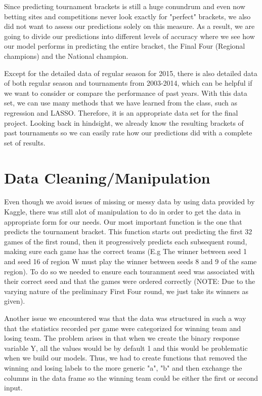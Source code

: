 \documentclass{article} %
\begin{document}
Since predicting tournament brackets is still a huge conundrum and even now betting sites and competitions never look exactly for "perfect" brackets, we also did not want to assess our predictions solely on this measure. As a result, we are going to divide our predictions into different levels of accuracy where we see how our model performs in predicting the entire bracket, the Final Four (Regional champions) and the National champion. 

Except for the detailed data of regular season for 2015, there is also detailed data of both regular season and tournaments from 2003-2014, which can be helpful if we want to consider or compare the performance of past years. With this data set, we can use many methods that we have learned from the class, such as regression and LASSO. Therefore, it is an appropriate data set for the final project. Looking back in hindsight, we already know the resulting brackets of past tournaments so we can easily rate how our predictions did with a complete set of results.

\section{Data Cleaning/Manipulation}

Even though we avoid issues of missing or messy data by using data provided by Kaggle, there was still alot of manipulation to do in order to get the data in appropriate form for our needs. Our most important function is the one that predicts the tournament bracket. This function starts out predicting the first 32 games of the first round, then it progressively predicts each subsequent round, making sure each game has the correct teams (E.g The winner between seed 1 and seed 16 of region W must play the winner between seeds 8 and 9 of the same region). To do so we needed to ensure each touranment seed was associated with their correct seed and that the games were ordered correctly (NOTE: Due to the varying nature of the preliminary First Four round, we just take its winners as given).

Another issue we encountered was that the data was structured in such a way that the statistics recorded per game were categorized for winning team and losing team. The problem arises in that when we create the binary response variable Y, all the values would be by default 1 and this would be problematic when we build our models. Thus, we had to create functions that removed the winning and losing labels to the more generic "a", "b" and then exchange the columns in the data frame so the winning team could be either the first or second input.
\end{document}
